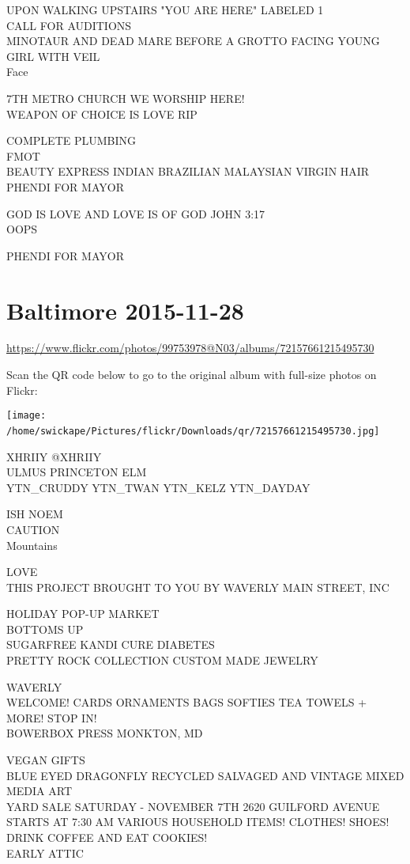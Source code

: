 \documentclass[10pt,letterpaper]{article}
\begin{document}
UPON WALKING UPSTAIRS "YOU ARE HERE" LABELED 1\\
CALL FOR AUDITIONS\\
MINOTAUR AND DEAD MARE BEFORE A GROTTO FACING YOUNG GIRL WITH VEIL\\
Face

7TH METRO CHURCH WE WORSHIP HERE!\\
WEAPON OF CHOICE IS LOVE RIP

COMPLETE PLUMBING\\
FMOT\\
BEAUTY EXPRESS INDIAN BRAZILIAN MALAYSIAN VIRGIN HAIR\\
PHENDI FOR MAYOR

GOD IS LOVE AND LOVE IS OF GOD JOHN 3:17\\
OOPS

PHENDI FOR MAYOR
\

\section*{Baltimore 2015-11-28}

\url{https://www.flickr.com/photos/99753978@N03/albums/72157661215495730}

Scan the QR code below to go to the original album with full-size photos on Flickr:

\texttt{[image: /home/swickape/Pictures/flickr/Downloads/qr/72157661215495730.jpg]}
\

XHRIIY @XHRIIY\\
ULMUS PRINCETON ELM\\
YTN\_CRUDDY YTN\_TWAN YTN\_KELZ YTN\_DAYDAY

ISH NOEM\\
CAUTION\\
Mountains

LOVE\\
THIS PROJECT BROUGHT TO YOU BY WAVERLY MAIN STREET, INC

HOLIDAY POP{-}UP MARKET\\
BOTTOMS UP\\
SUGARFREE KANDI CURE DIABETES\\
PRETTY ROCK COLLECTION CUSTOM MADE JEWELRY

WAVERLY\\
WELCOME!  CARDS ORNAMENTS BAGS SOFTIES TEA TOWELS + MORE! STOP IN!\\
BOWERBOX PRESS MONKTON, MD

VEGAN GIFTS\\
BLUE EYED DRAGONFLY RECYCLED SALVAGED AND VINTAGE MIXED MEDIA ART\\
YARD SALE SATURDAY {-} NOVEMBER 7TH 2620 GUILFORD AVENUE STARTS AT 7:30 AM VARIOUS HOUSEHOLD ITEMS!  CLOTHES!  SHOES!  DRINK COFFEE AND EAT COOKIES!\\
EARLY ATTIC
\end{document}
